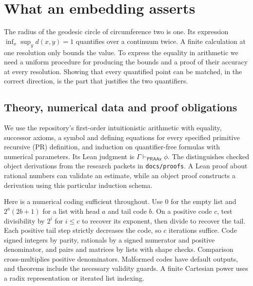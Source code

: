 \section{What an embedding asserts}
\label{sec:base}

The radius of the geodesic circle of circumference two is one. Its expression $\inf_x\sup_y d(x,y)=1$ quantifies over a continuum twice. A finite calculation at one resolution only bounds the value. To express the equality in arithmetic we need a uniform procedure for producing the bounds and a proof of their accuracy at every resolution. Showing that every quantified point can be matched, in the correct direction, is the part that justifies the two quantifiers.

\subsection{Theory, numerical data and proof obligations}

We use the repository's first-order intuitionistic arithmetic with equality, successor axioms, a symbol and defining equations for every specified primitive recursive (PR) definition, and induction on quantifier-free formulas with numerical parameters. Its Lean judgment is $\Gamma\vdash_{\mathsf{PRAAx}}\phi$. The  distinguishes checked object derivations from the research packets in \texttt{docs/proofs}. A Lean proof about rational numbers can validate an estimate, while an object proof constructs a derivation using this particular induction schema.

Here is a numerical coding sufficient throughout. Use $0$ for the empty list and $2^a(2b+1)$ for a list with head $a$ and tail code $b$. On a positive code $c$, test divisibility by $2^i$ for $i\le c$ to recover its exponent, then divide to recover the tail. Each positive tail step strictly decreases the code, so $c$ iterations suffice. Code signed integers by parity, rationals by a signed numerator and positive denominator, and pairs and matrices by lists with shape checks. Comparison cross-multiplies positive denominators. Malformed codes have default outputs, and theorems include the necessary validity guards. A finite Cartesian power uses a radix representation or iterated list indexing.

